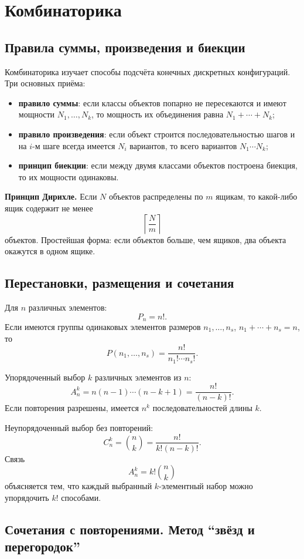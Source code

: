 \section{Комбинаторика}
\label{sec:combinatorics}

\subsection{Правила суммы, произведения и биекции}

Комбинаторика изучает способы подсчёта конечных дискретных конфигураций. Три
основных приёма:
\begin{itemize}
 \item \textbf{правило суммы}: если классы объектов попарно не пересекаются и
       имеют мощности $N_1,\ldots,N_k$, то мощность их объединения равна
       $N_1+\cdots+N_k$;
 \item \textbf{правило произведения}: если объект строится последовательностью
       шагов и на $i$-м шаге всегда имеется $N_i$ вариантов, то всего вариантов
       $N_1\cdots N_k$;
 \item \textbf{принцип биекции}: если между двумя классами объектов построена
       биекция, то их мощности одинаковы.
\end{itemize}

\textbf{Принцип Дирихле.} Если $N$ объектов распределены по $m$ ящикам, то
какой-либо ящик содержит не менее
\[
    \left\lceil\frac Nm\right\rceil
\]
объектов. Простейшая форма: если объектов больше, чем ящиков, два объекта
окажутся в одном ящике.

\subsection{Перестановки, размещения и сочетания}

Для $n$ различных элементов:
\[
    P_n=n!.
\]
Если имеются группы одинаковых элементов размеров $n_1,\ldots,n_s$,
$n_1+\cdots+n_s=n$, то
\[
    P(n_1,\ldots,n_s)=\frac{n!}{n_1!\cdots n_s!}.
\]

Упорядоченный выбор $k$ различных элементов из $n$:
\[
    A_n^k=n(n-1)\cdots(n-k+1)=\frac{n!}{(n-k)!}.
\]
Если повторения разрешены, имеется $n^k$ последовательностей длины $k$.

Неупорядоченный выбор без повторений:
\[
    C_n^k=\binom nk=\frac{n!}{k!(n-k)!}.
\]
Связь
\[
    A_n^k=k!\binom nk
\]
объясняется тем, что каждый выбранный $k$-элементный набор можно упорядочить
$k!$ способами.

\subsection{Сочетания с повторениями. Метод ``звёзд и перегородок''}

